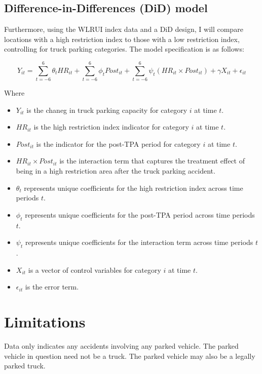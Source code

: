 \documentclass[
  12pt]{article}
\begin{document}
\subsection{Difference-in-Differences (DiD)
model}\label{difference-in-differences-did-model}

Furthermore, using the WLRUI index data and a DiD design, I will compare
locations with a high restriction index to those with a low restriction
index, controlling for truck parking categories. The model specification
is as follows:

\[
Y_{it} = \sum_{t=-6}^{6} \theta_t HR_{it} + \sum_{t=-6}^{6} \phi_t Post_{it} + \sum_{t=-6}^{6} \psi_t (HR_{it} \times Post_{it}) + \gamma X_{it} + \epsilon_{it}
\]

Where

\begin{itemize}
\item
  \(Y_{it}\) is the chaneg in truck parking capacity for category \(i\)
  at time \(t\).
\item
  \(HR_{it}\) is the high restriction index indicator for category \(i\)
  at time \(t\).
\item
  \(Post_{it}\) is the indicator for the post-TPA period for category
  \(i\) at time \(t\).
\item
  \(HR_{it} \times Post_{it}\) is the interaction term that captures the
  treatment effect of being in a high restriction area after the truck
  parking accident.
\item
  \(\theta_t\) represents unique coefficients for the high restriction
  index across time periods \(t\).
\item
  \(\phi_t\) represents unique coefficients for the post-TPA period
  across time periods \(t\).
\item
  \(\psi_t\) represents unique coefficients for the interaction term
  across time periods \(t\).
\item
  \(X_{it}\) is a vector of control variables for category \(i\) at time
  \(t\).
\item
  \(\epsilon_{it}\) is the error term.
\end{itemize}

\section{\texorpdfstring{\textbf{Limitations}}{Limitations}}\label{limitations}

Data only indicates any accidents involving any parked vehicle. The
parked vehicle in question need not be a truck. The parked vehicle may
also be a legally parked truck.~
\end{document}

